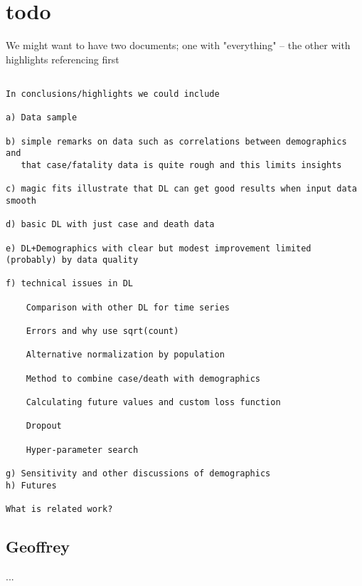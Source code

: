 \section{todo}

We might want to have two documents; one with "everything" -- the other with highlights referencing first

\begin{verbatim}

In conclusions/highlights we could include

a) Data sample

b) simple remarks on data such as correlations between demographics and 
   that case/fatality data is quite rough and this limits insights

c) magic fits illustrate that DL can get good results when input data smooth

d) basic DL with just case and death data

e) DL+Demographics with clear but modest improvement limited (probably) by data quality

f) technical issues in DL

    Comparison with other DL for time series

    Errors and why use sqrt(count)

    Alternative normalization by population

    Method to combine case/death with demographics

    Calculating future values and custom loss function

    Dropout

    Hyper-parameter search

g) Sensitivity and other discussions of demographics 
h) Futures

What is related work?

\end{verbatim}

\subsection{Geoffrey}

...